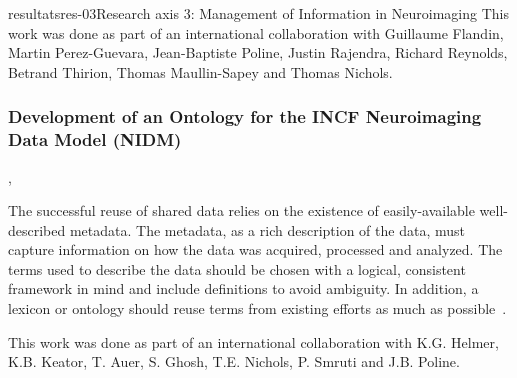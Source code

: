 \documentclass{ra2018}
\begin{document}
\begin{module}{resultats}{res-03}{Research axis 3: Management of Information in Neuroimaging}
This work was done as part of an international collaboration with Guillaume Flandin, Martin Perez-Guevara, Jean-Baptiste Poline, Justin Rajendra, Richard Reynolds, Betrand Thirion, Thomas Maullin-Sapey and Thomas Nichols.

\subsubsection{Development of an Ontology for the INCF Neuroimaging Data Model (NIDM)}
\begin{participants}
      ,
\end{participants}
The successful reuse of shared data relies on the existence of easily-available well-described metadata. The metadata, as a rich description of the data, must capture information on how the data was acquired, processed and analyzed. The terms used to describe the data should be chosen with a logical, consistent framework in mind and include definitions to avoid ambiguity. In addition, a lexicon or ontology should reuse terms from existing efforts as much as possible~\cite{helmer:inserm-01932994}.

This work was done as part of an international collaboration with K.G. Helmer, K.B. Keator, T. Auer, S. Ghosh, T.E. Nichols, P. Smruti and J.B. Poline.

\end{module}




\end{document}
